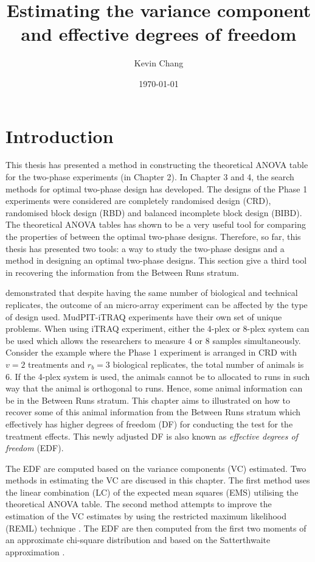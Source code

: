 \documentclass[12pt,a4paper]{article}
\begin{document}
\title{Estimating the variance component and effective degrees of freedom}
\author{Kevin Chang}
\date{\today}
\maketitle

\section{Introduction}
\label{sec:intro}
This thesis has presented a method in constructing the theoretical ANOVA table for the two-phase experiments (in Chapter 2). In Chapter 3 and 4, the search methods for optimal two-phase design has developed. The designs of the Phase 1 experiments were considered are completely randomised design (CRD), randomised block design (RBD) and balanced incomplete block design (BIBD). The theoretical ANOVA tables has shown to be a very useful tool for comparing the properties of between the optimal two-phase designs. Therefore, so far, this thesis has presented two tools: a way to study the two-phase designs and a method in designing an optimal two-phase designs. This section give a third tool in recovering the information from the Between Runs stratum.

\cite{Jarrett2008} demonstrated that despite having the same number of biological and technical replicates, the outcome of an micro-array experiment can be affected by the type of design used. MudPIT-iTRAQ experiments have their own set of unique problems. When using iTRAQ experiment, either the 4-plex or 8-plex system can be used which allows the researchers to measure 4 or 8 samples simultaneously. Consider the example where the Phase 1 experiment is arranged in CRD with $v = 2$ treatments and $r_b = 3$ biological replicates, the total number of animals is 6. If the 4-plex system is used, the animals cannot be to allocated to runs in such way that the animal is orthogonal to runs. Hence, some animal information can be in the Between Runs stratum. This chapter aims to illustrated on how to recover some of this animal information from the Between Runs stratum which effectively has higher degrees of freedom (DF) for conducting the test for the treatment effects. This newly adjusted DF is also known as \emph{effective degrees of freedom} (EDF). 

The EDF are computed based on the variance components (VC) estimated. Two methods in estimating the VC are discused in this chapter. The first method uses the linear combination (LC) of the expected mean squares (EMS) utilising the theoretical ANOVA table. The second method attempts to improve the estimation of the VC estimates by using the restricted maximum likelihood (REML) technique \citep{Patterson1971}. The EDF are then computed from the first two moments of an approximate chi-square distribution and based on the Satterthwaite approximation \citep{Jarrett2008, Satterthwaite1946}.
 
\end{document}
